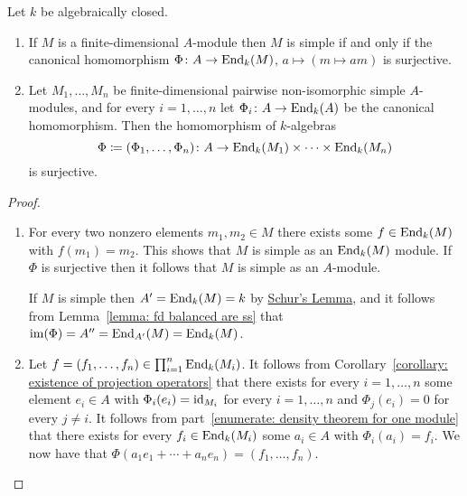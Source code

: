 \begin{theorem}
  \label{theorem: density theorem}
  Let $k$ be algebraically closed.
  \begin{enumerate}
    \item
      \label{enumerate: density theorem for one module}
      If $M$ is a finite-dimensional $A$-module then $M$ is simple if and only if the canonical homomorphism $\Phi \colon A \to \operatorname{End}_k(M)$, $a \mapsto (m \mapsto am)$ is surjective.
    \item
      Let $M_1, \dotsc, M_n$ be finite-dimensional pairwise non-isomorphic simple $A$-modules, and for every $i = 1, \dotsc, n$ let $\Phi_i \colon A \to \operatorname{End}_k(A)$ be the canonical homomorphism.
      Then the homomorphism of $k$-algebras
      \[
                  \Phi
        \coloneqq  (\Phi_1, \dotsc, \Phi_n)
        \colon    A
        \to       \operatorname{End}_k(M_1) \times \dotsb \times \operatorname{End}_k(M_n)
      \]
      is surjective.
  \end{enumerate}
\end{theorem}


\begin{proof}
  \leavevmode
  \begin{enumerate}
    \item
      For every two nonzero elements $m_1, m_2 \in M$ there exists some $f \in \operatorname{End}_k(M)$ with $f(m_1) = m_2$.
      This shows that $M$ is simple as an $\operatorname{End}_k(M)$ module.
      If $\Phi$ is surjective then it follows that $M$ is simple as an $A$-module.
      
      If $M$ is simple then $A' = \operatorname{End}_k(M) = k$ by \hyperref[proposition: schurs lemma for modules]{Schur’s Lemma}, and it follows from Lemma~\ref{lemma: fd balanced are ss} that $\operatorname{im}(\Phi) = A'' = \operatorname{End}_{A'}(M) = \operatorname{End}_k(M)$.
    \item
      Let $f = (f_1, \dotsc, f_n) \in \prod_{i=1}^n \operatorname{End}_k(M_i)$.
      It follows from Corollary~\ref{corollary: existence of projection operators} that there exists for every $i = 1, \dotsc, n$ some element $e_i \in A$ with $\Phi_i(e_i) = \operatorname{id}_{M_i}$ for every $i = 1, \dotsc, n$ and $\Phi_j(e_i) = 0$ for every $j \neq i$.
      It follows from part~\ref*{enumerate: density theorem for one module} that there exists for every $f_i \in \operatorname{End}_k(M_i)$ some $a_i \in A$ with $\Phi_i(a_i) = f_i$.
      We now have that $\Phi(a_1 e_1 + \dotsb + a_n e_n) = (f_1, \dotsc, f_n)$.
    \qedhere
  \end{enumerate}
\end{proof}


